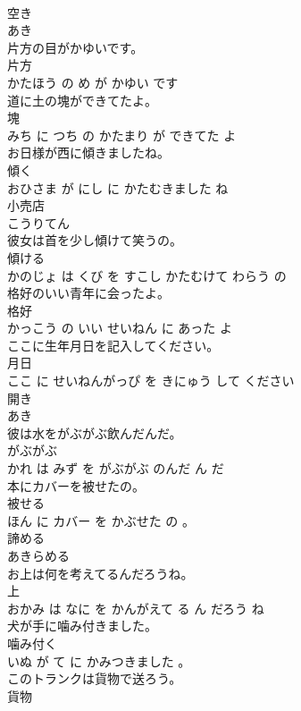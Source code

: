 \documentclass[8pt]{extreport}
\begin{document}
\begin{CJK}{UTF8}{min}
\\	空き	
\\	あき			
\\	片方の目がかゆいです。	
\\	片方 
\\	かたほう の め が かゆい です			
\\	道に土の塊ができてたよ。	
\\	塊 
\\	みち に つち の かたまり が できてた よ			
\\	お日様が西に傾きましたね。	
\\	傾く 
\\	おひさま が にし に かたむきました ね			
\\	小売店	
\\	こうりてん			
\\	彼女は首を少し傾けて笑うの。	
\\	傾ける 
\\	かのじょ は くび を すこし かたむけて わらう の			
\\	格好のいい青年に会ったよ。	
\\	格好 
\\	かっこう の いい せいねん に あった よ			
\\	ここに生年月日を記入してください。	
\\	月日 
\\	ここ に せいねんがっぴ を きにゅう して ください			
\\	開き	
\\	あき			
\\	彼は水をがぶがぶ飲んだんだ。	
\\	がぶがぶ 
\\	かれ は みず を がぶがぶ のんだ ん だ			
\\	本にカバーを被せたの。	
\\	被せる 
\\	ほん に カバー を かぶせた の 。			
\\	諦める	
\\	あきらめる			
\\	お上は何を考えてるんだろうね。	
\\	上 
\\	おかみ は なに を かんがえて る ん だろう ね			
\\	犬が手に噛み付きました。	
\\	噛み付く 
\\	いぬ が て に かみつきました 。			
\\	このトランクは貨物で送ろう。	
\\	貨物 

\end{CJK}
\end{document}

